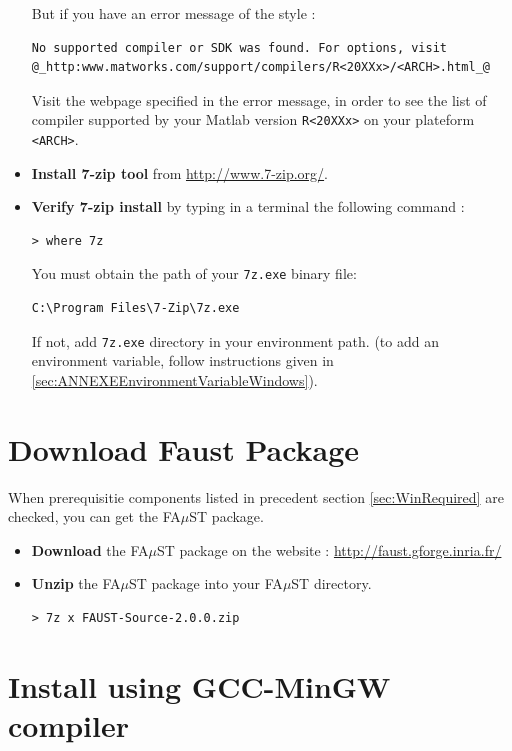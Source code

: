 \begin{itemize}
But if you have an error message of the style :
\begin{lstlisting}[backgroundcolor=\color{white},moredelim={**[is][\color{blue}]{@}{@}},moredelim={[is][\underbar]{_}{_}}]
No supported compiler or SDK was found. For options, visit 
@_http:www.matworks.com/support/compilers/R<20XXx>/<ARCH>.html_@
\end{lstlisting}
Visit the webpage specified in the error message,
in order to see the list of compiler supported by your Matlab version \texttt{R<20XXx>} on your plateform \texttt{<ARCH>}.

\item \textbf{Install 7-zip tool} from \url{http://www.7-zip.org/}. 

\item \textbf{Verify 7-zip install} by typing in a terminal the following command : 
\begin{lstlisting}
> where 7z
\end{lstlisting}
You must obtain the path of your \texttt{7z.exe} binary file: 
\begin{lstlisting}[backgroundcolor=\color{white}]
C:\Program Files\7-Zip\7z.exe
\end{lstlisting}
If not, add \texttt{7z.exe} directory in your environment path. 
(to add an environment variable, follow instructions given in \ref{sec:ANNEXEEnvironmentVariableWindows}). 

\end{itemize}

\section{Download Faust Package}\label{sec:WinDownload}
When prerequisitie components listed in precedent section \ref{sec:WinRequired} are checked, you can get the FA$\mu$ST package.
\begin{itemize}
\item \textbf{Download} the FA$\mu$ST package on the website : \url{http://faust.gforge.inria.fr/}
\item \textbf{Unzip} the FA$\mu$ST package into your FA$\mu$ST directory. 
\begin{lstlisting}
> 7z x FAUST-Source-2.0.0.zip
\end{lstlisting}
\end{itemize}


\section{Install using GCC-MinGW compiler}\label{sec:WinInstallMinGW}

